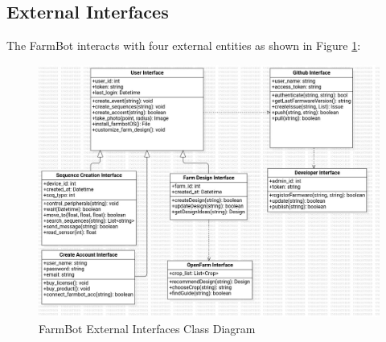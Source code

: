 \subsection{External Interfaces}

The FarmBot interacts with four external entities as shown in Figure \ref{fig:ExternalInterfacesClassDiagram}:
\begin{figure}[H]
    \centering
    \includegraphics[width=155mm]{Figures/ClassDiagram.jpg}
    \caption{FarmBot External Interfaces Class Diagram}\label{fig:ExternalInterfacesClassDiagram}
\end{figure}

